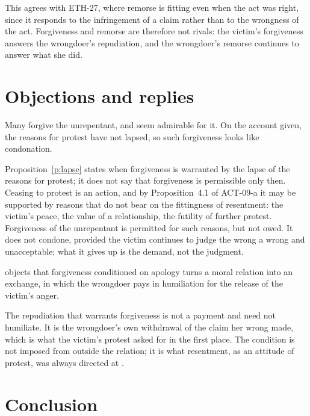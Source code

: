 \documentclass{situationist-preprint}
\begin{document}
This agrees with ETH-27, where remorse is fitting even when the act was right, since it responds to the infringement of a claim rather than to the wrongness of the act. Forgiveness and remorse are therefore not rivals: the victim's forgiveness answers the wrongdoer's repudiation, and the wrongdoer's remorse continues to answer what she did.

\section{Objections and replies}

\begin{objection}
Many forgive the unrepentant, and seem admirable for it. On the account given, the reasons for protest have not lapsed, so such forgiveness looks like condonation.
\end{objection}

\begin{reply}
Proposition~\ref{p:lapse} states when forgiveness is warranted by the lapse of the reasons for protest; it does not say that forgiveness is permissible only then. Ceasing to protest is an action, and by Proposition~4.1 of ACT-09-a it may be supported by reasons that do not bear on the fittingness of resentment: the victim's peace, the value of a relationship, the futility of further protest. Forgiveness of the unrepentant is permitted for such reasons, but not owed. It does not condone, provided the victim continues to judge the wrong a wrong and unacceptable; what it gives up is the demand, not the judgment.
\end{reply}

\begin{objection}[Transaction]
\citet{Nussbaum2016} objects that forgiveness conditioned on apology turns a moral relation into an exchange, in which the wrongdoer pays in humiliation for the release of the victim's anger.
\end{objection}

\begin{reply}
The repudiation that warrants forgiveness is not a payment and need not humiliate. It is the wrongdoer's own withdrawal of the claim her wrong made, which is what the victim's protest asked for in the first place. The condition is not imposed from outside the relation; it is what resentment, as an attitude of protest, was always directed at \citep{Strawson1962}.
\end{reply}

\section{Conclusion}
\end{document}
